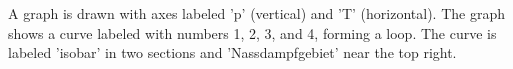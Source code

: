 A graph is drawn with axes labeled 'p' (vertical) and 'T' (horizontal). The graph shows a curve labeled with numbers 1, 2, 3, and 4, forming a loop. The curve is labeled 'isobar' in two sections and 'Nassdampfgebiet' near the top right.